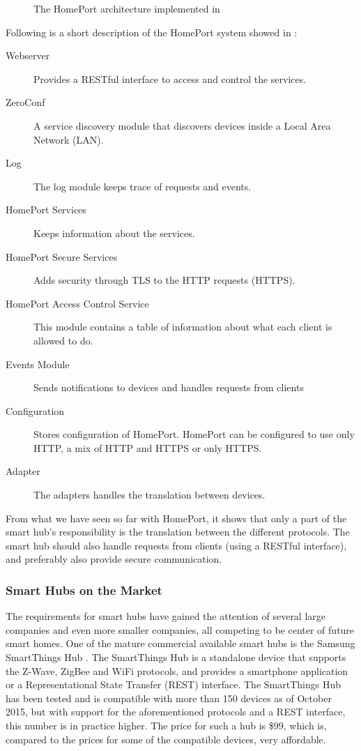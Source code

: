 \begin{figure}[!htb]
    \centering
    
    \caption{The HomePort architecture implemented in \protect\cite{HOMEPORT13}}
    \label{fig:homeport2}
\end{figure}

Following is a short description of the HomePort system showed in :
\begin{description}
    \item[Webserver] Provides a RESTful interface to access and control the services.
    \item[ZeroConf] A service discovery module that discovers devices inside a Local Area Network (LAN).
    \item[Log] The log module keeps trace of requests and events. 
    \item[HomePort Services] Keeps information about the services. 
    \item[HomePort Secure Services] Adds security through TLS to the HTTP requests (HTTPS).
    \item[HomePort Access Control Service] This module contains a table of information about what each client is allowed to do. 
    \item[Events Module] Sends notifications to devices and handles requests from clients
    \item[Configuration] Stores configuration of HomePort. HomePort can be configured to use only HTTP, a mix of HTTP and HTTPS or only HTTPS.
    \item[Adapter] The adapters handles the translation between devices. 
\end{description}

From what we have seen so far with HomePort, 
it shows that only a part of the smart hub's responsibility is the translation between the different protocols. 
The smart hub should also handle requests from clients (\eg using a RESTful interface), 
and preferably also provide secure communication. 

\subsubsection{Smart Hubs on the Market}
The requirements for smart hubs have gained the attention of several large companies and even more smaller companies, 
all competing to be center of future smart homes. 
One of the mature commercial available smart hubs is the Samsung SmartThings Hub \cite{SMARTTHINGS}. 
The SmartThings Hub is a standalone device that supports the Z-Wave, ZigBee and WiFi protocols, 
and provides a smartphone application or a Representational State Transfer (REST) interface. 
The SmartThings Hub has been tested and is compatible with more than 150 devices as of October 2015,
but with support for the aforementioned protocols and a REST interface, this number is in practice higher.  
The price for such a hub is \$99, which is, compared to the prices for some of the compatible devices, very affordable. 

